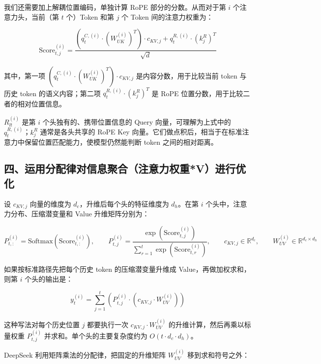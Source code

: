 我们还需要加上解耦位置编码，单独计算 RoPE 部分的分数。从而对于第 \(i\) 个注意力头，当前（第 \(t\) 个）Token 和第 \(j\) 个 Token 间的注意力权重为：

\[
\mathrm{Score}_{t,j}^{(i)}
=
\frac{
\left(q_t^{C,(i)} \cdot (W_{UK}^{(i)})^T\right) \cdot c_{KV,j}
+
q_t^{R,(i)} \cdot (k_j^R)^T
}{\sqrt{d}}
\]

其中，第一项 \(\left(q_t^{C,(i)} \cdot (W_{UK}^{(i)})^T\right) \cdot c_{KV,j}\) 是内容分数，用于比较当前 token 与历史 token 的语义内容；第二项 \(q_t^{R,(i)} \cdot (k_j^R)^T\) 是 RoPE 位置分数，用于比较二者的相对位置信息。

\(R_{lt}^{(i)}\) 是第 \(i\) 个头独有的、携带位置信息的 Query 向量，可理解为上式中的 \(q_t^{R,(i)}\)；\(k_j^R\) 通常是各头共享的 RoPE Key 向量。它们做点积后，相当于在标准注意力中保留位置匹配能力，使模型仍然能判断 token 之间的相对距离。

\hypertarget{ux56dbux8fd0ux7528ux5206ux914dux5f8bux5bf9ux4fe1ux606fux805aux5408ux6ce8ux610fux529bux6743ux91cdvux8fdbux884cux4f18ux5316}{%
\subsection{四、运用分配律对信息聚合（注意力权重*V）进行优化}\label{ux56dbux8fd0ux7528ux5206ux914dux5f8bux5bf9ux4fe1ux606fux805aux5408ux6ce8ux610fux529bux6743ux91cdvux8fdbux884cux4f18ux5316}}

设 \(c_{KV,j}\) 向量的维度为 \(d_c\)，升维后每个头的特征维度为 \(d_h\)。在第 \(i\) 个头中，注意力分布、压缩潜变量和 Value 升维矩阵分别为：

\[
P_{t,:}^{(i)} = \mathrm{Softmax}(\mathrm{Score}_{t,:}^{(i)}),\qquad
P_{t,j}^{(i)} =
\frac{\exp(\mathrm{Score}_{t,j}^{(i)})}{\sum_{r=1}^{t}\exp(\mathrm{Score}_{t,r}^{(i)})},\qquad
c_{KV,j}\in \mathbb{R}^{d_c},\qquad
W_{UV}^{(i)}\in \mathbb{R}^{d_c \times d_h}
\]

如果按标准路径先把每个历史 token 的压缩潜变量升维成 Value，再做加权求和，则第 \(i\) 个头的输出是：

\[
y_t^{(i)}
=
\sum_{j=1}^{t}
\left(P_{t,j}^{(i)} \cdot (c_{KV,j} \cdot W_{UV}^{(i)})\right)
\]

这种写法对每个历史位置 \(j\) 都要执行一次 \(c_{KV,j} \cdot W_{UV}^{(i)}\) 的升维计算，然后再乘以标量权重 \(P_{t,j}^{(i)}\) 并求和。单个头的主要复杂度约为 \(O(t \cdot d_c \cdot d_h)\)。

DeepSeek 利用矩阵乘法的分配律，把固定的升维矩阵 \(W_{UV}^{(i)}\) 移到求和符号之外：

